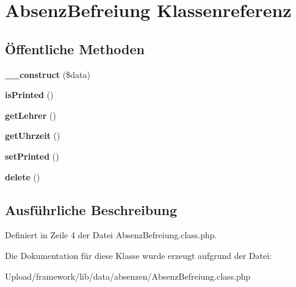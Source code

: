 \hypertarget{class_absenz_befreiung}{}\section{Absenz\+Befreiung Klassenreferenz}
\label{class_absenz_befreiung}
\subsection*{Öffentliche Methoden}
\begin{DoxyCompactItemize}
\item 
\mbox{\label{class_absenz_befreiung_a466cfda13d4b30f0049b0f088ebb4594}} 
{\bfseries \+\_\+\+\_\+construct} (\$data)
\item 
\mbox{\label{class_absenz_befreiung_aa3f2c77606b2dd170e9ad4f7dad3e963}} 
{\bfseries is\+Printed} ()
\item 
\mbox{\label{class_absenz_befreiung_a6c7fbc0883073e5165bb709d4a570074}} 
{\bfseries get\+Lehrer} ()
\item 
\mbox{\label{class_absenz_befreiung_a7729117f3f50d5e6625ea8d9ab8fc7e5}} 
{\bfseries get\+Uhrzeit} ()
\item 
\mbox{\label{class_absenz_befreiung_a4301663b500b75e7b3f96213124d50bf}} 
{\bfseries set\+Printed} ()
\item 
\mbox{\label{class_absenz_befreiung_a4778812de368191f8ed62fe7558b5d27}} 
{\bfseries delete} ()
\end{DoxyCompactItemize}


\subsection{Ausführliche Beschreibung}


Definiert in Zeile 4 der Datei Absenz\+Befreiung.\+class.\+php.



Die Dokumentation für diese Klasse wurde erzeugt aufgrund der Datei\+:\begin{DoxyCompactItemize}
\item 
Upload/framework/lib/data/absenzen/Absenz\+Befreiung.\+class.\+php\end{DoxyCompactItemize}
